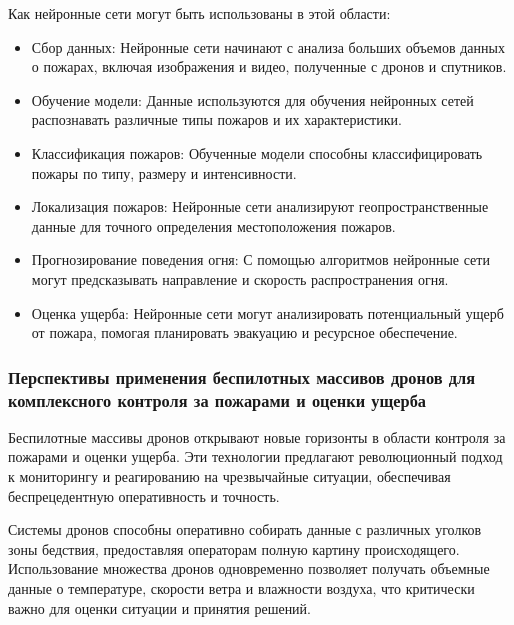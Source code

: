 Как нейронные сети могут быть использованы в этой области:
\begin{itemize}
	\item Сбор данных: Нейронные сети начинают с анализа больших объемов данных о пожарах, включая изображения и видео, полученные с дронов и спутников.
	\item Обучение модели: Данные используются для обучения нейронных сетей распознавать различные типы пожаров и их характеристики.
	\item Классификация пожаров: Обученные модели способны классифицировать пожары по типу, размеру и интенсивности.
	\item Локализация пожаров: Нейронные сети анализируют геопространственные данные для точного определения местоположения пожаров.
	\item Прогнозирование поведения огня: С помощью алгоритмов нейронные сети могут предсказывать направление и скорость распространения огня.
	\item Оценка ущерба: Нейронные сети могут анализировать потенциальный ущерб от пожара, помогая планировать эвакуацию и ресурсное обеспечение.
\end{itemize}

\subsubsection{Перспективы применения беспилотных массивов дронов для комплексного контроля за пожарами и оценки ущерба}
Беспилотные массивы дронов открывают новые горизонты в области контроля за пожарами и оценки ущерба. Эти технологии предлагают революционный подход к мониторингу и реагированию на чрезвычайные ситуации, обеспечивая беспрецедентную оперативность и точность.

Системы дронов способны оперативно собирать данные с различных уголков зоны бедствия, предоставляя операторам полную картину происходящего. Использование множества дронов одновременно позволяет получать объемные данные о температуре, скорости ветра и влажности воздуха, что критически важно для оценки ситуации и принятия решений.


